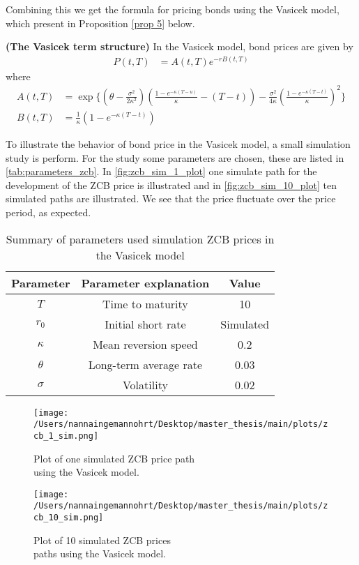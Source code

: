  Combining this we get the formula for pricing bonds using the Vasicek model, which present 
 in Proposition \autoref{prop 5} below. 
\begin{proposition}
    \label{prop 5}
    \textbf{(The Vasicek term structure)} In the Vasicek model, bond prices are given by
 \begin{align}
    P(t,T) &= A(t,T) e^{-rB(t,T)} 
\end{align}
where
\begin{align*}
    A(t,T)&= \exp \Biggl\{\left(\theta-\frac{\sigma^2}{2 \kappa^2}\right)\left(\frac{1-e^{-\kappa(T-u)}}{\kappa}-(T-t)\right)
    -\frac{\sigma^2}{4 \kappa}\left(\frac{1-e^{-\kappa(T-t)}}{\kappa}\right)^2 \Biggr\} \\
    B(t,T) & =\frac{1}{\kappa} \left( 1 - e^{-\kappa (T-t)} \right)  
\end{align*}
\cite{Bjork}

\end{proposition}
\noindent
To illustrate the behavior of bond price in the Vasicek model, a small simulation study is perform. For the study 
some parameters are chosen, these are listed in \autoref{tab:parameters_zcb}. In \autoref{fig:zcb_sim_1_plot} one simulate
path for the development of the ZCB price is illustrated and in \autoref{fig:zcb_sim_10_plot} ten simulated paths are illustrated.
We see that the price fluctuate over the price period, as expected.
\begin{table}[H]
    \centering
    \begin{tabular}{ccc}
      \toprule
      \textbf{Parameter} & \textbf{Parameter explanation} & \textbf{Value} \\
      \midrule
      $T$ & Time to maturity & 10 \\
      $r_0$ & Initial short rate & Simulated \\
      $\kappa$ & Mean reversion speed & 0.2\\
      $\theta$ & Long-term average rate  & 0.03 \\
      $\sigma$ & Volatility& 0.02 \\
      \bottomrule
    \end{tabular}
    \caption{Summary of parameters used simulation ZCB prices in the Vasicek model}
    \label{tab:parameters_zcb}
\end{table}
\noindent
\begin{figure}[H]
    \centering
    \begin{minipage}{0.5\textwidth}
        \texttt{[image: /Users/nannaingemannohrt/Desktop/master\_thesis/main/plots/zcb\_1\_sim.png]}
        \caption{Plot of one simulated ZCB price path \\ using the Vasicek model.}
        \label{fig:zcb_sim_1_plot}
    \end{minipage}\hfill 
    \begin{minipage}{0.5\textwidth}
        \texttt{[image: /Users/nannaingemannohrt/Desktop/master\_thesis/main/plots/zcb\_10\_sim.png]}
        \caption{Plot of 10 simulated  ZCB prices \\ paths using the Vasicek model.}
        \label{fig:zcb_sim_10_plot}
    \end{minipage}
\end{figure}
